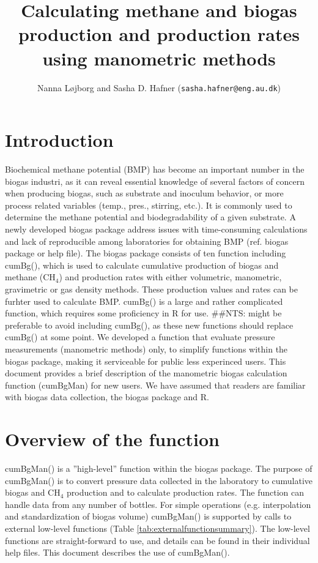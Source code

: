 \documentclass{article}
\title{Calculating methane and biogas production and production rates using manometric methods}
\author{Nanna Løjborg and Sasha D. Hafner (\texttt{sasha.hafner@eng.au.dk})}
\begin{document}


\maketitle

\section{Introduction}
Biochemical methane potential (BMP) has become an important number in the biogas industri, as it can reveal essential knowledge of several factors of concern when producing biogas, such as substrate and inoculum behavior, or more process related variables (temp., pres., stirring, etc.). It is commonly used to determine the methane potential and biodegradability of a given substrate. A newly developed biogas package address issues with time-consuming calculations and lack of reproducible among laboratories for obtaining BMP (ref. biogas package or help file). The biogas package consists of ten function including cumBg(), which is used to calculate cumulative production of biogas and methane (CH$_4$) and production rates with either volumetric, manometric, gravimetric or gas density methods. These production values and rates can be furhter used to calculate BMP. cumBg() is a large and rather complicated function, which requires some proficiency in R for use. ##NTS: might be preferable to avoid including cumBg(), as these new functions should replace cumBg() at some point. 
We developed a function that evaluate pressure measurements (manometric methods) only, to simplify functions within the biogas package, making it serviceable for public less experinced users. 
This document provides a brief description of the manometric biogas calculation function (cumBgMan) for new users.
We have assumed that readers are familiar with biogas data collection, the biogas package and R.

\section{Overview of the function}
cumBgMan() is a ''high-level'' function within the biogas package. The purpose of cumBgMan() is to convert pressure data collected in the laboratory to cumulative biogas and CH$_4$ production and to calculate production rates. The function can handle data from any number of bottles. For simple operations (e.g. interpolation and standardization of biogas volume) cumBgMan() is supported by calls to external low-level functions (Table \ref{tab:externalfunctionsummary}). The low-level functions are straight-forward to use, and details can be found in their individual help files.
This document describes the use of cumBgMan(). 
\end{document}
